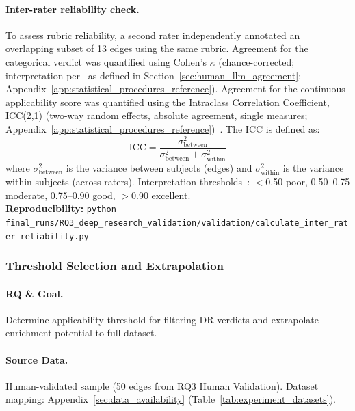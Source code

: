 \paragraph{Inter-rater reliability check.}
To assess rubric reliability, a second rater independently annotated an overlapping subset of 13 edges using the same rubric. Agreement for the categorical verdict was quantified using Cohen's $\kappa$ (chance-corrected; interpretation per~\cite{landis1977measurement} as defined in Section~\ref{sec:human_llm_agreement}; Appendix~\ref{app:statistical_procedures_reference}). Agreement for the continuous applicability score was quantified using the Intraclass Correlation Coefficient, ICC(2,1) (two-way random effects, absolute agreement, single measures; Appendix~\ref{app:statistical_procedures_reference})~\citep{koo2016guideline}. The ICC is defined as:
\[
\text{ICC} = \frac{\sigma^2_{\text{between}}}{\sigma^2_{\text{between}} + \sigma^2_{\text{within}}}
\]
where $\sigma^2_{\text{between}}$ is the variance between subjects (edges) and $\sigma^2_{\text{within}}$ is the variance within subjects (across raters). Interpretation thresholds~\citep{koo2016guideline}: $<$0.50 poor, 0.50--0.75 moderate, 0.75--0.90 good, $>$0.90 excellent.\\
\textbf{Reproducibility:} \texttt{python final\_runs/RQ3\_deep\_research\_validation/validation/calculate\_inter\_rater\_reliability.py}

\subsubsection{Threshold Selection and Extrapolation}
\label{sec:rq3_threshold_selection}

\paragraph{RQ \& Goal.}
Determine applicability threshold for filtering DR verdicts and extrapolate enrichment potential to full dataset.

\paragraph{Source Data.}
Human-validated sample (50 edges from RQ3 Human Validation). Dataset mapping: Appendix~\ref{sec:data_availability} (Table~\ref{tab:experiment_datasets}).

